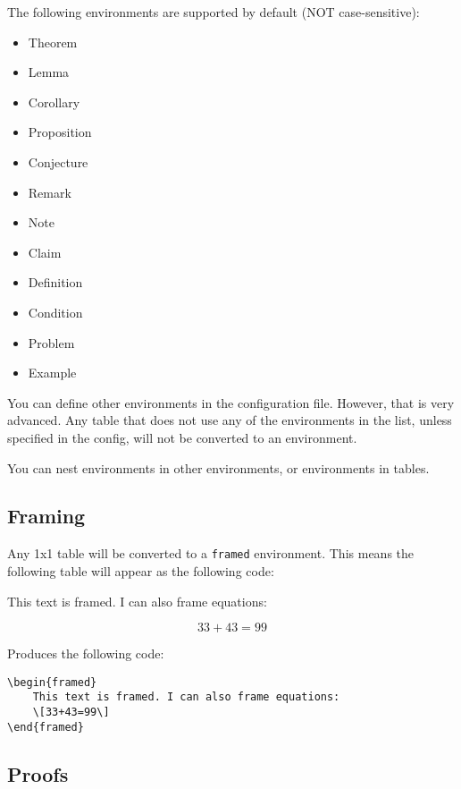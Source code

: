 \documentclass[12pt]{article}
\theoremstyle{plain}
\theoremstyle{remark}
\theoremstyle{definition}
\begin{document}
The following environments are supported by default (NOT
case-sensitive):

\begin{itemize}
\item
  Theorem
\item
  Lemma
\item
  Corollary
\item
  Proposition
\item
  Conjecture
\item
  Remark
\item
  Note
\item
  Claim
\item
  Definition
\item
  Condition
\item
  Problem
\item
  Example
\end{itemize}

You can define other environments in the configuration file. However,
that is very advanced. Any table that does not use any of the
environments in the list, unless specified in the config, will not be
converted to an environment.

You can nest environments in other environments, or environments in
tables.


\subsection{Framing}

Any 1x1 table will be converted to a \texttt{framed} environment. This
means the following table will appear as the following code:

\begin{framed}

This text is framed. I can also frame equations:

\[33 + 43 = 99\]

\end{framed}



Produces the following code:

\begin{verbatim}
\begin{framed}
    This text is framed. I can also frame equations:
    \[33+43=99\]
\end{framed}
\end{verbatim}


\subsection{Proofs}
\end{document}
